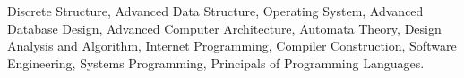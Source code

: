 

\begin{cvparagraph}

  Discrete Structure, Advanced Data Structure, Operating System, Advanced Database Design, Advanced
  Computer Architecture, Automata Theory, Design Analysis and Algorithm, Internet Programming, Compiler
  Construction, Software Engineering, Systems Programming, Principals of Programming Languages.

\end{cvparagraph}
